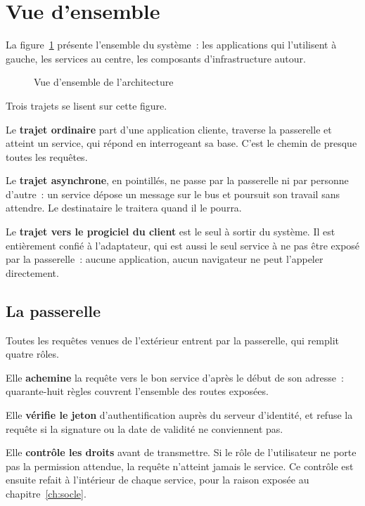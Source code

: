 \section{Vue d'ensemble}

La figure~\ref{fig:archi-globale} présente l'ensemble du système~: les applications qui l'utilisent à
gauche, les services au centre, les composants d'infrastructure autour.

\begin{figure}[H]
\centering
{}
\caption{Vue d'ensemble de l'architecture}
\label{fig:archi-globale}
\end{figure}

Trois trajets se lisent sur cette figure.

Le \textbf{trajet ordinaire} part d'une application cliente, traverse la passerelle et atteint un
service, qui répond en interrogeant sa base. C'est le chemin de presque toutes les requêtes.

Le \textbf{trajet asynchrone}, en pointillés, ne passe par la passerelle ni par personne d'autre~: un
service dépose un message sur le bus et poursuit son travail sans attendre. Le destinataire le
traitera quand il le pourra.

Le \textbf{trajet vers le progiciel du client} est le seul à sortir du système. Il est entièrement
confié à l'adaptateur, qui est aussi le seul service à ne pas être exposé par la passerelle~: aucune
application, aucun navigateur ne peut l'appeler directement.

\subsection{La passerelle}

Toutes les requêtes venues de l'extérieur entrent par la passerelle, qui remplit quatre rôles.

Elle \textbf{achemine} la requête vers le bon service d'après le début de son adresse~:
quarante-huit règles couvrent l'ensemble des routes exposées.

Elle \textbf{vérifie le jeton} d'authentification auprès du serveur d'identité, et refuse la requête
si la signature ou la date de validité ne conviennent pas.

Elle \textbf{contrôle les droits} avant de transmettre. Si le rôle de l'utilisateur ne porte pas la
permission attendue, la requête n'atteint jamais le service. Ce contrôle est ensuite refait à
l'intérieur de chaque service, pour la raison exposée au chapitre~\ref{ch:socle}.

